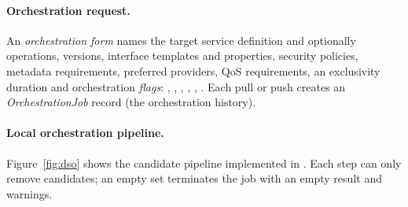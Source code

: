 \documentclass[a4paper]{arrowhead}
\begin{document}
\paragraph{Orchestration request.} An \emph{orchestration form} names the target service
definition and optionally operations, versions, interface templates and properties, security
policies, metadata requirements, preferred providers, QoS requirements, an exclusivity
duration and orchestration \emph{flags}: , ,
, , ,
. Each pull or push creates an \emph{OrchestrationJob} record
(the orchestration history).

\paragraph{Local orchestration pipeline.} Figure~\ref{fig:dso} shows the candidate pipeline
implemented in . Each step can only remove candidates;
an empty set terminates the job with an empty result and warnings.
\end{document}
